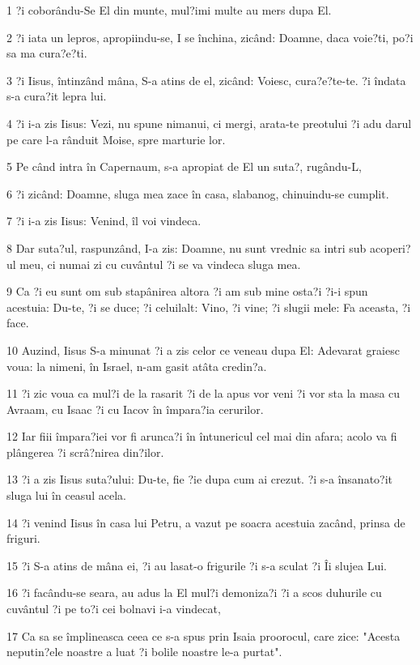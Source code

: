 \par 1 ?i coborându-Se El din munte, mul?imi multe au mers dupa El.
\par 2 ?i iata un lepros, apropiindu-se, I se închina, zicând: Doamne, daca voie?ti, po?i sa ma cura?e?ti.
\par 3 ?i Iisus, întinzând mâna, S-a atins de el, zicând: Voiesc, cura?e?te-te. ?i îndata s-a cura?it lepra lui.
\par 4 ?i i-a zis Iisus: Vezi, nu spune nimanui, ci mergi, arata-te preotului ?i adu darul pe care l-a rânduit Moise, spre marturie lor.
\par 5 Pe când intra în Capernaum, s-a apropiat de El un suta?, rugându-L,
\par 6 ?i zicând: Doamne, sluga mea zace în casa, slabanog, chinuindu-se cumplit.
\par 7 ?i i-a zis Iisus: Venind, îl voi vindeca.
\par 8 Dar suta?ul, raspunzând, I-a zis: Doamne, nu sunt vrednic sa intri sub acoperi?ul meu, ci numai zi cu cuvântul ?i se va vindeca sluga mea.
\par 9 Ca ?i eu sunt om sub stapânirea altora ?i am sub mine osta?i ?i-i spun acestuia: Du-te, ?i se duce; ?i celuilalt: Vino, ?i vine; ?i slugii mele: Fa aceasta, ?i face.
\par 10 Auzind, Iisus S-a minunat ?i a zis celor ce veneau dupa El: Adevarat graiesc voua: la nimeni, în Israel, n-am gasit atâta credin?a.
\par 11 ?i zic voua ca mul?i de la rasarit ?i de la apus vor veni ?i vor sta la masa cu Avraam, cu Isaac ?i cu Iacov în împara?ia cerurilor.
\par 12 Iar fiii împara?iei vor fi arunca?i în întunericul cel mai din afara; acolo va fi plângerea ?i scrâ?nirea din?ilor.
\par 13 ?i a zis Iisus suta?ului: Du-te, fie ?ie dupa cum ai crezut. ?i s-a însanato?it sluga lui în ceasul acela.
\par 14 ?i venind Iisus în casa lui Petru, a vazut pe soacra acestuia zacând, prinsa de friguri.
\par 15 ?i S-a atins de mâna ei, ?i au lasat-o frigurile ?i s-a sculat ?i Îi slujea Lui.
\par 16 ?i facându-se seara, au adus la El mul?i demoniza?i ?i a scos duhurile cu cuvântul ?i pe to?i cei bolnavi i-a vindecat,
\par 17 Ca sa se împlineasca ceea ce s-a spus prin Isaia proorocul, care zice: "Acesta neputin?ele noastre a luat ?i bolile noastre le-a purtat".
